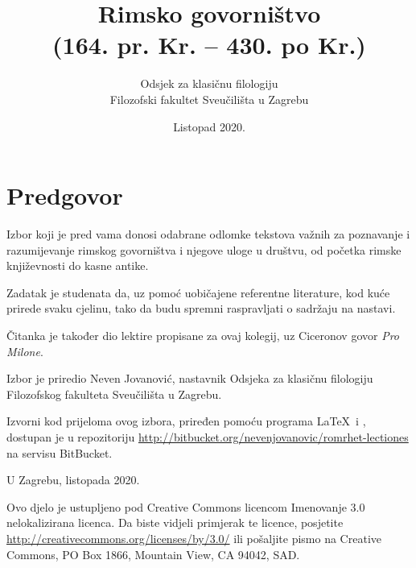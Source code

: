 \documentclass[a4paper,12pt,twoside]{report}
\newcommand{\subtitle}[1]{%
  \posttitle{%
    \par\end{center}
    \begin{center}\large#1\end{center}
    \vskip0.5em}%
}
\begin{document}
\title{Rimsko govorništvo\\(164. pr. Kr. – 430. po Kr.)}
\subtitle{Čitanka}
\author{Odsjek za klasičnu filologiju\\
Filozofski fakultet Sveučilišta u Zagrebu}
\date{Listopad 2020.}
\maketitle

\clearpage
\thispagestyle{empty}


\tableofcontents


\chapter*{Predgovor}


Izbor koji je pred vama donosi odabrane odlomke tekstova važnih za poznavanje i razumijevanje rimskog govorništva i njegove uloge u društvu, od početka rimske književnosti do kasne antike.

Zadatak je studenata da, uz pomoć uobičajene referentne literature, kod kuće prirede svaku cjelinu, tako da budu spremni raspravljati o sadržaju na nastavi.

Čitanka je također dio lektire propisane za ovaj kolegij, uz Ciceronov govor \textit{Pro Milone}.

Izbor je priredio Neven Jovanović, nastavnik Odsjeka za klasičnu filologiju Filozofskog fakulteta Sveučilišta u Zagrebu.

Izvorni kod prijeloma ovog izbora, priređen pomoću programa \LaTeX\ i \XeLaTeX, dostupan je u repozitoriju \url{http://bitbucket.org/nevenjovanovic/romrhet-lectiones} na servisu BitBucket.



\medskip

U Zagrebu, listopada 2020.

\vspace*{\fill}

\noindent Ovo djelo je ustupljeno pod Creative Commons licencom Imenovanje 3.0 nelokalizirana licenca. Da biste vidjeli primjerak te licence, posjetite \url{http://creativecommons.org/licenses/by/3.0/} ili pošaljite pismo na Creative Commons, PO Box 1866, Mountain View, CA 94042, SAD.
\end{document}
